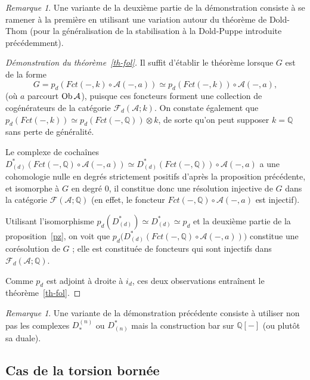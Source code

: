 \documentclass[a4paper,10pt]{article}
\newcommand{\A}{{\mathcal{A}}}
\newcommand{\F}{{\mathcal{F}}}
\theoremstyle{definition}
\theoremstyle{remark}
\newtheorem{rem}[thm]{Remarque}
\begin{document}
\begin{rem}
 Une variante de la deuxième partie de la démonstration consiste à se ramener à la première en utilisant une variation autour du théorème de Dold-Thom (pour la généralisation de la stabilisation à la Dold-Puppe introduite précédemment).
\end{rem}


\begin{proof}[Démonstration du théorème~\ref{th-fol}]
 Il suffit d'établir le théorème lorsque $G$ est de la forme
$$G=p_d(Fct(-,k)\circ\A(-,a))\simeq p_d(Fct(-,k))\circ\A(-,a),$$
(où $a$ parcourt ${\rm Ob}\,\A$), puisque ces foncteurs forment une collection de cogénérateurs de la catégorie $\F_d(\A;k)$. On constate également que $p_d(Fct(-,k))\simeq p_d(Fct(-,\mathbb{Q}))\otimes k$, de sorte qu'on peut supposer $k=\mathbb{Q}$ sans perte de généralité.

Le complexe de cochaînes $D^*_{(d)}(Fct(-,\mathbb{Q})\circ\A(-,a))\simeq D^*_{(d)}(Fct(-,\mathbb{Q}))\circ\A(-,a)$ a une cohomologie nulle en degrés strictement positifs d'après la proposition précédente, et isomorphe à $G$ en degré $0$, il constitue donc une résolution injective de $G$ dans la catégorie $\F(\A;\mathbb{Q})$ (en effet, le foncteur $Fct(-,\mathbb{Q})\circ\A(-,a)$ est injectif).

Utilisant l'isomorphisme $p_d(D^*_{(d)})\simeq D^*_{(d)}\simeq p_d$ et la deuxième partie de la proposition~\ref{pz}, on voit que $p_d\big(D^*_{(d)}(Fct(-,\mathbb{Q})\circ\A(-,a))\big)$ constitue une corésolution de $G$ ; elle est constituée de foncteurs qui sont injectifs dans $\F_d(\A;\mathbb{Q})$.

Comme $p_d$ est adjoint à droite à $i_d$, ces deux observations entraînent le théorème~\ref{th-fol}.
\end{proof}


\begin{rem}
 Une variante de la démonstration précédente consiste à utiliser non pas les complexes $D^{(n)}_*$ ou $D_{(n)}^*$ mais la construction bar sur $\mathbb{Q}[-]$ (ou plutôt sa duale).
\end{rem}



\subsection{Cas de la torsion bornée}
\end{document}
